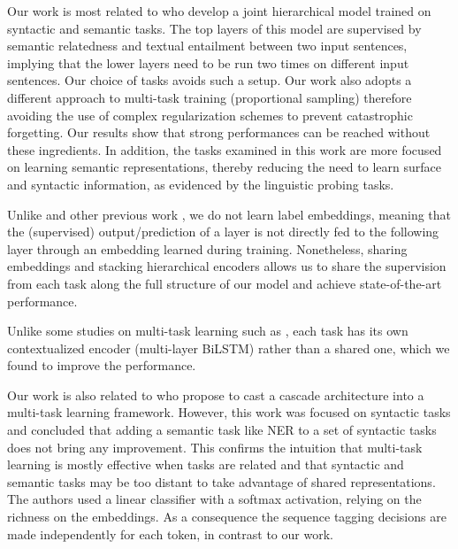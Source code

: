 \documentclass[letterpaper]{article} \usepackage{aaai19}  \usepackage{times}  \usepackage{helvet}  \usepackage{courier}  \usepackage{url}  \usepackage{graphicx}  \usepackage{todonotes}
\begin{document}
Our work is most related to \citeauthor{Hashimoto2017}  who develop a joint hierarchical model trained on syntactic and semantic tasks. The top layers of this model are supervised by semantic relatedness and textual entailment between two input sentences, implying that the lower layers need to be run two times on different input sentences. Our choice of tasks avoids such a setup. Our work also adopts a different approach to multi-task training (proportional sampling) therefore avoiding the use of complex regularization schemes to prevent catastrophic forgetting. Our results show that strong performances can be reached without these ingredients. In addition, the tasks examined in this work are more focused on learning semantic representations, thereby reducing the need to learn surface and syntactic information, as evidenced by the linguistic probing tasks.

Unlike \cite{Hashimoto2017} and other previous work \cite{Katiyar2017,Bekoulis2018,Augenstein2018}, we do not learn label embeddings, meaning that the (supervised) output/prediction of a layer is not directly fed to the following layer through an embedding learned during training. Nonetheless, sharing embeddings and stacking hierarchical encoders allows us to share the supervision from each task along the full structure of our model and achieve state-of-the-art performance.

Unlike some studies on multi-task learning such as \cite{Subramanian2018}, each task has its own contextualized encoder (multi-layer BiLSTM) rather than a shared one, which we found to improve the performance. 

Our work is also related to \citeauthor{Sogaard2016}  who propose to cast a cascade architecture into a multi-task learning framework. However, this work was focused on syntactic tasks and concluded that adding a semantic task like NER to a set of syntactic tasks does not bring any improvement. This confirms the intuition that multi-task learning is mostly effective when tasks are related and that syntactic and semantic tasks may be too distant to take advantage of shared representations. The authors used a linear classifier with a softmax activation, relying on the richness on the embeddings. As a consequence the sequence tagging decisions are made independently for each token, in contrast to our work.
\end{document}
